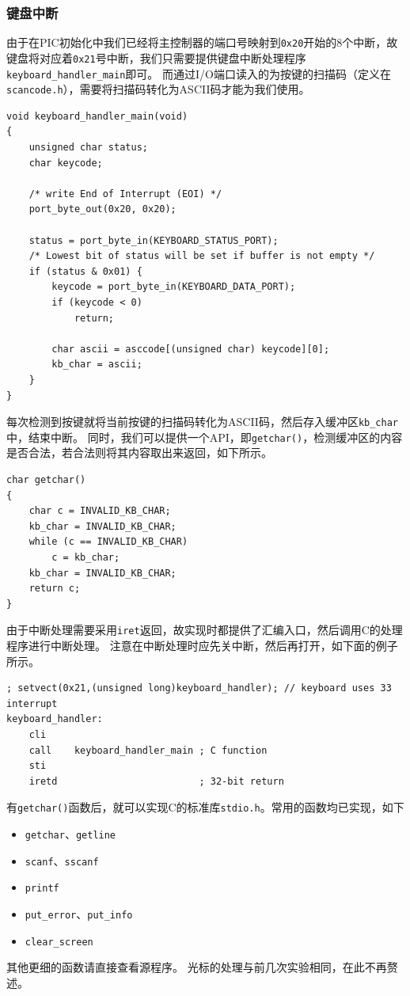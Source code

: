 \documentclass[logo,reportComp]{thesis}
\begin{document}
\subsubsection{键盘中断}
由于在PIC初始化中我们已经将主控制器的端口号映射到\verb'0x20'开始的8个中断，故键盘将对应着\verb'0x21'号中断，我们只需要提供键盘中断处理程序\verb'keyboard_handler_main'即可。
而通过I/O端口读入的为按键的扫描码（定义在\verb'scancode.h'），需要将扫描码转化为ASCII码才能为我们使用。
\begin{lstlisting}
void keyboard_handler_main(void)
{
	unsigned char status;
	char keycode;

	/* write End of Interrupt (EOI) */
	port_byte_out(0x20, 0x20);

	status = port_byte_in(KEYBOARD_STATUS_PORT);
	/* Lowest bit of status will be set if buffer is not empty */
	if (status & 0x01) {
		keycode = port_byte_in(KEYBOARD_DATA_PORT);
		if (keycode < 0)
			return;

		char ascii = asccode[(unsigned char) keycode][0];
		kb_char = ascii;
	}
}
\end{lstlisting}

每次检测到按键就将当前按键的扫描码转化为ASCII码，然后存入缓冲区\verb'kb_char'中，结束中断。
同时，我们可以提供一个API，即\verb'getchar()'，检测缓冲区的内容是否合法，若合法则将其内容取出来返回，如下所示。
\begin{lstlisting}
char getchar()
{
	char c = INVALID_KB_CHAR;
	kb_char = INVALID_KB_CHAR;
	while (c == INVALID_KB_CHAR)
		c = kb_char;
	kb_char = INVALID_KB_CHAR;
	return c;
}
\end{lstlisting}

由于中断处理需要采用\verb'iret'返回，故实现时都提供了汇编入口，然后调用C的处理程序进行中断处理。
注意在中断处理时应先关中断，然后再打开，如下面的例子所示。
\begin{lstlisting}[language={[x86masm]Assembler}]
; setvect(0x21,(unsigned long)keyboard_handler); // keyboard uses 33 interrupt
keyboard_handler:
	cli
	call    keyboard_handler_main ; C function
	sti
	iretd                         ; 32-bit return
\end{lstlisting}

有\verb'getchar()'函数后，就可以实现C的标准库\verb'stdio.h'。常用的函数均已实现，如下
\begin{itemize}
	\item \verb'getchar'、\verb'getline'
	\item \verb'scanf'、\verb'sscanf'
	\item \verb'printf'
	\item \verb'put_error'、\verb'put_info'
	\item \verb'clear_screen'
\end{itemize}
其他更细的函数请直接查看源程序。
光标的处理与前几次实验相同，在此不再赘述。
\end{document}
